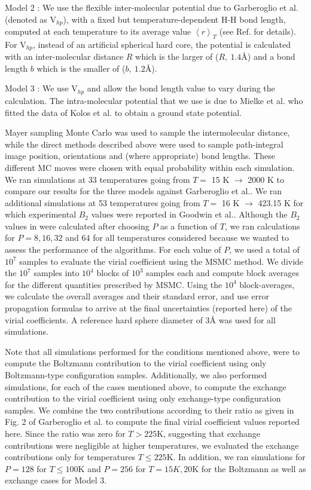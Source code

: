         Model 2 : We use the flexible inter-molecular potential due to Garberoglio et al.\cite{Garberoglio2012} (denoted as V$_{hp}$), with a fixed but temperature-dependent H-H bond length, computed at each temperature to its average value $\left< r \right>_T$ (see Ref. \cite{Garberoglio2012} for details). For V$_{hp}$, instead of an artificial spherical hard core, the potential is calculated with an inter-molecular distance $R$ which is the larger of ($R,\: 1.4${\AA}) and a bond length $b$ which is the smaller of ($b,\: 1.2${\AA}).

        Model 3 : We use V$_{hp}$ and allow the bond length value to vary during the calculation. The intra-molecular potential that we use is due to Mielke et al.\cite{Mielke2002} who fitted the data of Kolos et al.\cite{Kolos1986} to obtain a ground state potential.

        Mayer sampling Monte Carlo was used to sample the intermolecular distance, while the direct methods described above were used to sample path-integral image position, orientations and (where appropriate) bond lengths. These different MC moves were chosen with equal probability within each simulation. We ran simulations at 33 temperatures going from $T =$ 15 K $\to$ 2000 K to compare our results for the three models against Garberoglio et al.\cite{Garberoglio2014}. We ran additional simulations at 53 temperatures going from $T =$ 16 K $\to$ 423.15 K for which experimental $B_2$ values were reported in Goodwin et al.\cite{Goodwin1963}. Although the $B_2$ values in \cite{Garberoglio2014} were calculated after choosing $P$ as a function of $T$, we ran calculations for $P = 8, 16, 32$ and $64$ for all temperatures considered because we wanted to assess the performance of the algorithms. For each value of $P$, we used a total of $10^7$ samples to evaluate the virial coefficient using the MSMC\cite{Singh2004} method. We divide the $10^7$ samples into $10^4$ blocks of $10^3$ samples each and compute block averages for the different quantities prescribed by MSMC. Using the $10^4$ block-averages, we calculate the overall averages and their standard error, and use error propagation formulas to arrive at the final uncertainties (reported here) of the virial coefficients. A reference hard sphere diameter of 3{\AA} was used for all simulations.

        Note that all simulations performed for the conditions mentioned above, were to compute the Boltzmann contribution to the virial coefficient using only Boltzmann-type configuration samples. Additionally, we also performed simulations, for each of the cases mentioned above, to compute the exchange contribution to the virial coefficient using only exchange-type configuration samples. We combine the two contributions according to their ratio as given in Fig. 2 of Garberoglio et al. \cite{Garberoglio2014} to compute the final virial coefficient values reported here. Since the ratio was zero for $T > 225$K, suggesting that exchange contributions were negligible at higher temperatures, we evaluated the exchange contributions only for temperatures $T \le 225$K. In addition, we ran simulations for $P = 128$ for $T \le 100$K and $P = 256$ for $T = 15K, 20$K for the Boltzmann as well as exchange cases for Model 3.

